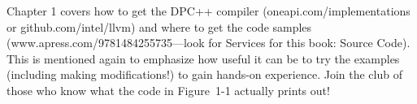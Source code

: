 

Chapter 1 covers how to get the DPC++ compiler (oneapi.com/implementations or github.com/intel/llvm) and where to get the code samples (www.apress.com/9781484255735—look for Services for this book: Source Code). This is mentioned again to emphasize how useful it can be to try the examples (including making modifications!) to gain hands-on experience. Join the club of those who know what the code in Figure 1-1 actually prints out!\par